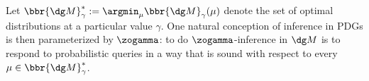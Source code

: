 Let $\bbr{\dg M}^*_\gamma := \argmin_\mu \bbr{\dg M}_\gamma(\mu)$ denote
the set of optimal distributions at a particular value $\gamma$.
%
%
%
One natural conception of inference in PDGs is then parameterized by
$\zogamma$:
to do $\zogamma$-inference
in $\dg M$ is to respond to probabilistic queries in a way that is sound with respect to every $\mu \in \bbr{\dg M}^*_\gamma$.
